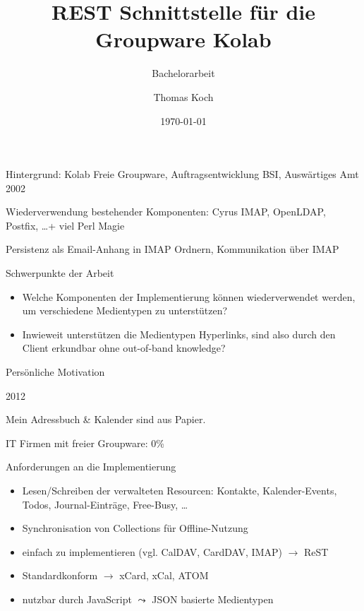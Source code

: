 \documentclass{beamer}
\title{REST Schnittstelle für die Groupware Kolab}
\subtitle{Bachelorarbeit}
\date{\today}
\author{Thomas Koch}
\begin{document}
\begin{frame}
  \maketitle{}
\end{frame}

\begin{frame}{Hintergrund: Kolab}
  Freie Groupware, Auftragsentwicklung BSI, Auswärtiges Amt 2002

  Wiederverwendung bestehender Komponenten: Cyrus IMAP, OpenLDAP, Postfix, \ldots + viel Perl Magie

  Persistenz als Email-Anhang in IMAP Ordnern, Kommunikation über IMAP
\end{frame}

\begin{frame}{Schwerpunkte der Arbeit}
  \begin{itemize}
  \item Welche Komponenten der Implementierung können wiederverwendet werden, um verschiedene Medientypen zu unterstützen?
  \item Inwieweit unterstützen die Medientypen Hyperlinks, sind also durch den Client erkundbar ohne out-of-band knowledge?
  \end{itemize}  
\end{frame}

\begin{frame}{Persönliche Motivation}
  \begin{center}
    2012

    Mein Adressbuch \& Kalender sind aus Papier.

    IT Firmen mit freier Groupware: 0\%
  \end{center}
\end{frame}

\begin{frame}{Anforderungen an die Implementierung}
  \begin{itemize}
  \item Lesen/Schreiben der verwalteten Resourcen: Kontakte, Kalender-Events, Todos, Journal-Einträge, Free-Busy, \ldots
  \item Synchronisation von Collections für Offline-Nutzung
  \item einfach zu implementieren (vgl. CalDAV, CardDAV, IMAP) $\rightarrow$ ReST
  \item Standardkonform $\rightarrow$ xCard, xCal, ATOM
  \item nutzbar durch JavaScript $\leadsto$ JSON basierte Medientypen
  \end{itemize}
\end{frame}
\end{document}
